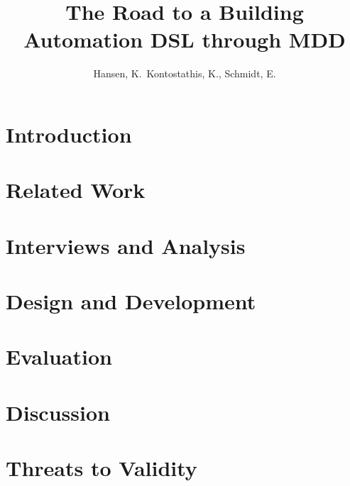 \documentclass{"The Road to a Building Automation DSL through MDD"}
\begin{document}
\pagestyle{headings}
\title{The Road to a Building Automation DSL through MDD}
\author{Hansen, K.\, Kontostathis, K., Schmidt, E.}
\maketitle



\section{Introduction}\label{sec:introduction}


\section{Related Work}\label{sec:relatedwork}


\section{Interviews and Analysis}\label{sec:interviewsAndAnalysis}


\section{Design and Development}\label{sec:designAndDevelopment} 


\section{Evaluation}\label{sec:evaluation} 

 
\section{Discussion}\label{sec:discussion}


\section{Threats to Validity}\label{sec:threatsToValidity}

\end{document}
